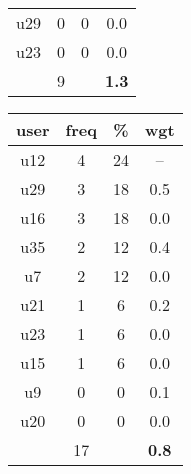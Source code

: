 \begin{appendices}
\begin{table}
\begin{tabular}{ |c|c|c|c| }
	u29 & 0 & 0 & 0.0 \\
	u23 & 0 & 0 & 0.0 \\
	 & 9 & & \textbf{1.3} \\
	\hline
\end{tabular}
\begin{tabular}{ |c|c|c|c| }
	\hline
	\textbf{user} & \textbf{freq} & \textbf{\%} & \textbf{wgt} \\
	\hline
	u12 & 4 & 24 & -- \\
	u29 & 3 & 18 & 0.5 \\
	u16 & 3 & 18 & 0.0 \\
	u35 & 2 & 12 & 0.4 \\
	u7 & 2 & 12 & 0.0 \\
	u21 & 1 & 6 & 0.2 \\
	u23 & 1 & 6 & 0.0 \\
	u15 & 1 & 6 & 0.0 \\
	u9 & 0 & 0 & 0.1 \\
	u20 & 0 & 0 & 0.0 \\
	 & 17 & & \textbf{0.8} \\
	\hline
\end{tabular}
\end{table}

\end{appendices}
